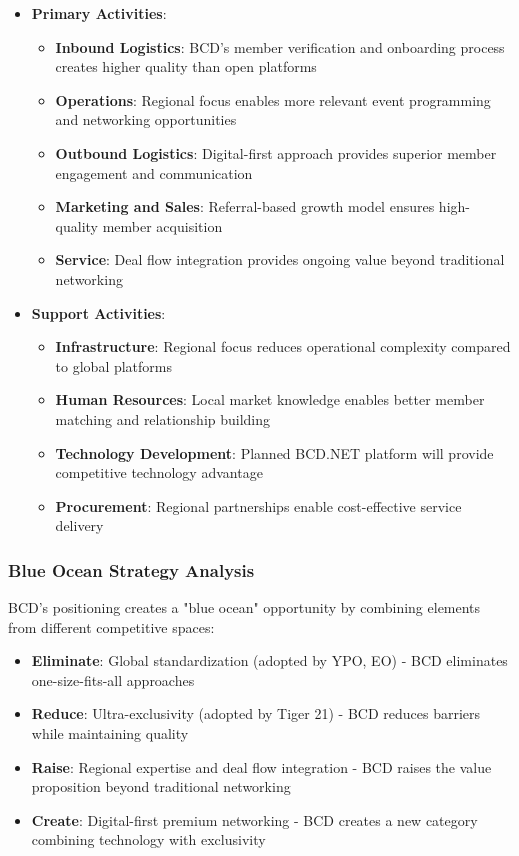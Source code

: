 \begin{itemize}
    \item \textbf{Primary Activities}:
    \begin{itemize}
        \item \textbf{Inbound Logistics}: BCD's member verification and onboarding process creates higher quality than open platforms
        \item \textbf{Operations}: Regional focus enables more relevant event programming and networking opportunities
        \item \textbf{Outbound Logistics}: Digital-first approach provides superior member engagement and communication
        \item \textbf{Marketing and Sales}: Referral-based growth model ensures high-quality member acquisition
        \item \textbf{Service}: Deal flow integration provides ongoing value beyond traditional networking
    \end{itemize}
    
    \item \textbf{Support Activities}:
    \begin{itemize}
        \item \textbf{Infrastructure}: Regional focus reduces operational complexity compared to global platforms
        \item \textbf{Human Resources}: Local market knowledge enables better member matching and relationship building
        \item \textbf{Technology Development}: Planned BCD.NET platform will provide competitive technology advantage
        \item \textbf{Procurement}: Regional partnerships enable cost-effective service delivery
    \end{itemize}
\end{itemize}

\subsubsection{Blue Ocean Strategy Analysis}

BCD's positioning creates a "blue ocean" opportunity by combining elements from different competitive spaces:

\begin{itemize}
    \item \textbf{Eliminate}: Global standardization (adopted by YPO, EO) - BCD eliminates one-size-fits-all approaches
    \item \textbf{Reduce}: Ultra-exclusivity (adopted by Tiger 21) - BCD reduces barriers while maintaining quality
    \item \textbf{Raise}: Regional expertise and deal flow integration - BCD raises the value proposition beyond traditional networking
    \item \textbf{Create}: Digital-first premium networking - BCD creates a new category combining technology with exclusivity
\end{itemize}

